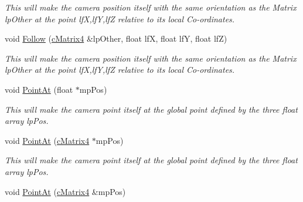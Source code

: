\begin{DoxyCompactItemize}
\begin{DoxyCompactList}\small\item\em This will make the camera position itself with the same orientation as the Matrix lpOther at the point lfX,lfY,lfZ relative to its local Co-\/ordinates. \end{DoxyCompactList}\item 
\hypertarget{classc_camera_matrix4_a1f0549e1ae97a959863a8fe27bec1169}{
void \hyperlink{classc_camera_matrix4_a1f0549e1ae97a959863a8fe27bec1169}{Follow} (\hyperlink{classc_matrix4}{cMatrix4} \&lpOther, float lfX, float lfY, float lfZ)}
\label{classc_camera_matrix4_a1f0549e1ae97a959863a8fe27bec1169}

\begin{DoxyCompactList}\small\item\em This will make the camera position itself with the same orientation as the Matrix lpOther at the point lfX,lfY,lfZ relative to its local Co-\/ordinates. \end{DoxyCompactList}\item 
\hypertarget{classc_camera_matrix4_aa8ca47d59f6b3b454d700329bdbbdeea}{
void \hyperlink{classc_camera_matrix4_aa8ca47d59f6b3b454d700329bdbbdeea}{PointAt} (float $\ast$mpPos)}
\label{classc_camera_matrix4_aa8ca47d59f6b3b454d700329bdbbdeea}

\begin{DoxyCompactList}\small\item\em This will make the camera point itself at the global point defined by the three float array lpPos. \end{DoxyCompactList}\item 
\hypertarget{classc_camera_matrix4_af4d7a8a24ba247bbd035e22ef609981c}{
void \hyperlink{classc_camera_matrix4_af4d7a8a24ba247bbd035e22ef609981c}{PointAt} (\hyperlink{classc_matrix4}{cMatrix4} $\ast$mpPos)}
\label{classc_camera_matrix4_af4d7a8a24ba247bbd035e22ef609981c}

\begin{DoxyCompactList}\small\item\em This will make the camera point itself at the global point defined by the three float array lpPos. \end{DoxyCompactList}\item 
\hypertarget{classc_camera_matrix4_aa4cd6a1c22791a336c3eb21d0a0d94e4}{
void \hyperlink{classc_camera_matrix4_aa4cd6a1c22791a336c3eb21d0a0d94e4}{PointAt} (\hyperlink{classc_matrix4}{cMatrix4} \&mpPos)}
\label{classc_camera_matrix4_aa4cd6a1c22791a336c3eb21d0a0d94e4}


\end{DoxyCompactItemize}
